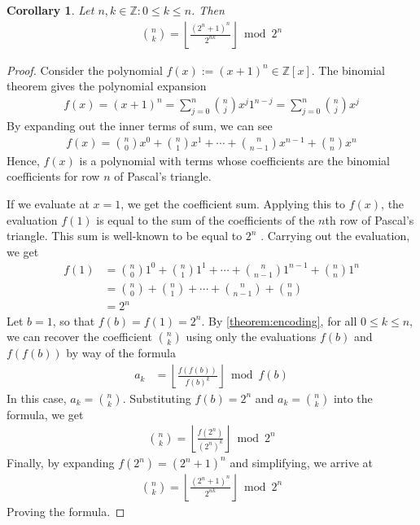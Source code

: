 \documentclass[11pt,reqno]{article}
\theoremstyle{plain}
\newtheorem{corollary}[theorem]{Corollary}
\theoremstyle{definition}
\newcommand{\floor}[1]{\left\lfloor #1 \right\rfloor}
\begin{document}
\begin{corollary}
Let $n,k \in \mathbb{Z} : 0 \leq k \leq n$. Then
\begin{align*}
\binom{n}{k} = \floor{\frac{(2^n+1)^n}{2^{n k}}} \bmod{2^n}
\end{align*}
\end{corollary}
\begin{proof}
Consider the polynomial $f(x) := (x+1)^n \in \mathbb{Z}[x]$. The binomial theorem gives the polynomial expansion
\begin{align*}
    f(x) = (x+1)^n = \sum_{j=0}^n \binom{n}{j} x^j 1^{n-j} = \sum_{j=0}^n \binom{n}{j} x^j
\end{align*}
By expanding out the inner terms of sum, we can see
\begin{align*}
    f(x) = \binom{n}{0} x^0 + \binom{n}{1} x^1 + \cdots + \binom{n}{n-1} x^{n-1} + \binom{n}{n} x^{n} 
\end{align*}
Hence, $f(x)$ is a polynomial with terms whose coefficients are the binomial coefficients for row $n$ of Pascal's triangle. 

If we evaluate at $x=1$, we get the coefficient sum. Applying this to $f(x)$, the evaluation $f(1)$ is equal to the sum of the coefficients of the $n$th row of Pascal's triangle. This sum is well-known to be equal to $2^n$ \cite{A000079}. Carrying out the evaluation, we get
\begin{align*}
f(1) &= \binom{n}{0} 1^0 + \binom{n}{1} 1^1 + \cdots + \binom{n}{n-1} 1^{n-1} + \binom{n}{n} 1^{n} \\
&= \binom{n}{0} + \binom{n}{1} + \cdots + \binom{n}{n-1} + \binom{n}{n} \\
&= 2^n
\end{align*}
Let $b = 1$, so that $f(b) = f(1) = 2^n$. By \cref{theorem:encoding}, for all $0 \leq k \leq n$, we can recover the coefficient $\binom{n}{k}$ using only the evaluations $f(b)$ and $f(f(b))$ by way of the formula
\begin{align*}
    a_k &= \floor{\frac{f(f(b))}{f(b)^k}} \bmod{f(b)}
\end{align*}
In this case, $a_k = \binom{n}{k}$. Substituting $f(b) = 2^n$ and $a_k = \binom{n}{k}$ into the formula, we get
\begin{align*}
    \binom{n}{k} = \floor{\frac{f(2^n)}{(2^n)^k}} \bmod{2^n}
\end{align*}
Finally, by expanding $f(2^n) = (2^n+1)^n$ and simplifying, we arrive at
\begin{align*}
    \binom{n}{k} = \floor{\frac{(2^n+1)^n}{2^{nk}}} \bmod{2^n}
\end{align*}
Proving the formula.
\end{proof}
\end{document}
